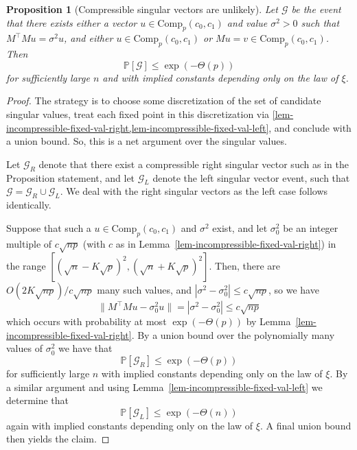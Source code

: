 \documentclass[11pt]{article}
\numberwithin{equation}{section}
\newtheorem{proposition}[theorem]{Proposition}
\theoremstyle{remark}
\newcommand{\Comp}{\mathrm{Comp}}
\begin{document}
\begin{proposition}[Compressible singular vectors are unlikely]\label{prop-incompressible-varying-val}
    Let $\mathcal{G}$ be the event that there exists either a vector $u \in \Comp_{p}(c_0, c_1)$ and value $\sigma^2 > 0$ such that $M^\top Mu = \sigma^2 u$, and either $u \in \Comp_{p}(c_0, c_1)$ or $Mu = v \in \Comp_{p}(c_0, c_1)$. Then 
    \begin{equation*}
        \mathbb{P}[\mathcal{G}] \leq \exp(-\Theta(p))
    \end{equation*}
    for sufficiently large $n$ and with implied constants depending only on the law of $\xi$.
\end{proposition}
\begin{proof}
    The strategy is to choose some discretization of the set of candidate singular values, treat each fixed point in this discretization via \cref{lem-incompressible-fixed-val-right,lem-incompressible-fixed-val-left}, and conclude with a union bound. So, this is a net argument over the singular values.

    Let $\mathcal{G}_R$ denote that there exist a compressible right singular vector such as in the Proposition statement, and let $\mathcal{G}_L$ denote the left singular vector event, such that $\mathcal{G} = \mathcal{G}_R \cup \mathcal{G}_L$. We deal with the right singular vectors as the left case follows identically.
    
    Suppose that such a $u \in \Comp_{p}(c_0, c_1)$ and $\sigma^2$ exist, and let $\sigma_0^2$ be an integer multiple of $c \sqrt{np}$ (with $c$ as in Lemma~\ref{lem-incompressible-fixed-val-right}) in the range $[(\sqrt{n} - K\sqrt{p})^2, (\sqrt{n} + K\sqrt{p})^2]$. Then, there are $O(2K\sqrt{np})/c\sqrt{np}$ many such values, and $|\sigma^2 - \sigma_0^2| \leq c \sqrt{np}$, so we have 
    \begin{equation*}
        \|M^\top  M u - \sigma_0^2 u \| = |\sigma^2 - \sigma_0^2| \leq c \sqrt{np}
    \end{equation*}
    which occurs with probability at most $\exp(- \Theta(p))$ by Lemma~\ref{lem-incompressible-fixed-val-right}. By a union bound over the polynomially many values of $\sigma_0^2$ we have that 
    \begin{equation*}
        \mathbb{P}[\mathcal{G}_R] \leq \exp(-\Theta(p))
    \end{equation*}
    for sufficiently large $n$ with implied constants depending only on the law of $\xi$. By a similar argument and using Lemma~\ref{lem-incompressible-fixed-val-left} we determine that
    \begin{equation*}
        \mathbb{P}[\mathcal{G}_L] \leq \exp(-\Theta(n))
    \end{equation*}
    again with implied constants depending only on the law of $\xi$. A final union bound then yields the claim.
\end{proof}
\end{document}
